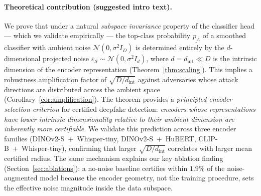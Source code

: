 %
%




\paragraph*{Theoretical contribution (suggested intro text).}
We prove that under a natural \emph{subspace invariance} property
of the classifier head — which we validate empirically — the
top-class probability $\underline{p_A}$ of a smoothed classifier
with ambient noise $\mathcal{N}(0,\sigma^2 I_D)$ is determined
entirely by the $d$-dimensional projected noise
$\varepsilon_\mathcal{S} \sim \mathcal{N}(0,\sigma^2 I_d)$, where
$d = d_\text{int} \ll D$ is the intrinsic dimension of the encoder
representation (Theorem~\ref{thm:scaling}).
This implies a robustness amplification factor of
$\sqrt{D/d_\text{int}}$ against adversaries whose attack directions
are distributed across the ambient space (Corollary~\ref{cor:amplification}).
The theorem provides a \emph{principled encoder selection criterion}
for certified deepfake detection:
\textit{encoders whose representations have lower intrinsic
dimensionality relative to their ambient dimension are
inherently more certifiable.}
We validate this prediction across three encoder families
(DINOv2-S~+~Whisper-tiny, DINOv2-S~+~HuBERT, CLIP-B~+~Whisper-tiny),
confirming that larger $\sqrt{D/d_\text{int}}$ correlates with
larger mean certified radius.
The same mechanism explains our key ablation finding
(Section~\ref{sec:ablations}): a no-noise baseline certifies
within $1.9\%$ of the noise-augmented model because the encoder
geometry, not the training procedure, sets the effective noise
magnitude inside the data subspace.


